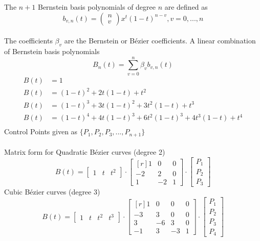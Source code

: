 \documentclass[10pt,letterpaper]{article}
\begin{document}
\noindent
The $n + 1$ Bernstein basis polynomials of degree $n$ are defined as
\[
 b_{v,n}(t) =  \left(
\begin{matrix}
n\\
v
\end{matrix}
\right)x^t(1 - t)^{n - v}, v = 0,...,n
\]
\\
The coefficients $\beta_v$ are the Bernstein or Bézier coefficients.
A linear combination of Bernstein basis polynomials
\[
B_n(t) = \displaystyle\sum_{v = 0}^n\beta_v b_{v,n}(t)
\]
\begin{align*}
B(t) &= 1 \\
B(t) &= (1-t)^2 + 2t(1-t) + t^2 \\
B(t) &= (1-t)^3 + 3t(1-t)^2 + 3t^2(1-t) + t^3 \\
B(t) &= (1-t)^4 + 4t(1-t)^3 + 6t^2(1-t)^3 + 4t^3(1-t) + t^4 \\
\end{align*}
Control Points given as $ \lbrace P_1, P_2, P_3, ..., P_{n+1}\rbrace$\\
\\
Matrix form for Quadratic Bézier curves (degree 2)\\
\[
B(t) =
\begin{bmatrix} 1 & t & t^2 \end{bmatrix}
\cdot
\begin{bmatrix}[r]
1 & 0 & 0\\
-2 & 2 & 0\\
1 & -2 & 1
\end{bmatrix}
\cdot
\begin{bmatrix}
P_1\\
P_2\\
P_3
\end{bmatrix}
\]
\newline
\newline
Cubic Bézier curves (degree 3)
\[
B(t) =
\begin{bmatrix}
1 & t & t^2 & t^3
\end{bmatrix}
\cdot
\begin{bmatrix}[r]
1 & 0 & 0 & 0\\
-3 & 3 & 0 & 0\\
3 & -6 & 3 & 0\\
-1 & 3 & -3 & 1
\end{bmatrix}
\cdot
\begin{bmatrix}
P_1\\
P_2\\
P_3\\
P_4
\end{bmatrix}
\]
\end{document}
